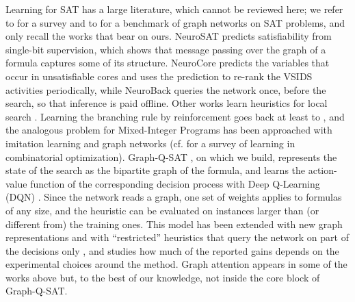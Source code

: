 \documentclass[11pt,a4paper]{article}
\begin{document}
\smallskip
\noindent
Learning for SAT has a large literature, which cannot be reviewed here; we
refer to \cite{Guo2023} for a survey and to \cite{Li2024} for a benchmark of
graph networks on SAT problems, and only recall the works that bear on ours.
NeuroSAT \cite{Selsam2019} predicts satisfiability from single-bit
supervision, which shows that message passing \cite{Gilmer2017} over the graph
of a formula captures some of its structure. NeuroCore \cite{SelsamBjorner2019}
predicts the variables that occur in unsatisfiable cores and uses the
prediction to re-rank the VSIDS activities periodically, while NeuroBack
\cite{Wang2024} queries the network once, before the search, so that inference
is paid offline. Other works learn heuristics for local search
\cite{YolcuPoczos2019,Zhang2020}. Learning the branching rule by reinforcement
goes back at least to \cite{LagoudakisLittman2001}, and the
analogous problem for Mixed-Integer Programs has been approached with
imitation learning and graph networks \cite{Khalil2016,Gasse2019} (cf.
\cite{Bengio2021} for a survey of learning in combinatorial optimization).
Graph-Q-SAT \cite{Kurin2020}, on which we build, represents the state of the
search as the bipartite graph of the formula, and learns the action-value
function of the corresponding decision process with Deep Q-Learning (DQN)
\cite{Mnih2015}. Since the network reads a graph, one set of weights applies to
formulas of any size, and the heuristic can be evaluated on instances larger
than (or different from) the training ones. This model has been extended with
new graph representations and with ``restricted'' heuristics that query the
network on part of the decisions only \cite{Shirokikh2023}, and
\cite{Mojzisek2026} studies how much of the reported gains depends on the
experimental choices around the method. Graph attention
\cite{Velickovic2018,Brody2022} appears in some of the works above but, to the
best of our knowledge, not inside the core block of Graph-Q-SAT.
\end{document}
